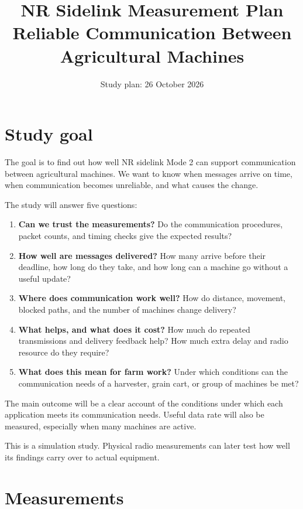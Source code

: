 \documentclass[11pt,a4paper]{article}
\title{\textbf{NR Sidelink Measurement Plan}\\[0.4em]
\large Reliable Communication Between Agricultural Machines}
\author{}
\date{Study plan: 26 October 2026}
\begin{document}
\maketitle

\section{Study goal}

The goal is to find out how well NR sidelink Mode 2 can support communication
between agricultural machines. We want to know when messages arrive on time,
when communication becomes unreliable, and what causes the change.

The study will answer five questions:
\begin{enumerate}
  \item \textbf{Can we trust the measurements?}
        Do the communication procedures, packet counts, and timing checks
        give the expected results?
  \item \textbf{How well are messages delivered?}
        How many arrive before their deadline, how long do they take,
        and how long can a machine go without a useful update?
  \item \textbf{Where does communication work well?}
        How do distance, movement, blocked paths, and the number of machines
        change delivery?
  \item \textbf{What helps, and what does it cost?}
        How much do repeated transmissions and delivery feedback help?
        How much extra delay and radio resource do they require?
  \item \textbf{What does this mean for farm work?}
        Under which conditions can the communication needs of a harvester,
        grain cart, or group of machines be met?
\end{enumerate}

The main outcome will be a clear account of the conditions under which each
application meets its communication needs. Useful data rate will also be
measured, especially when many machines are active.

This is a simulation study. Physical radio measurements can later test how
well its findings carry over to actual equipment.

\section{Measurements}
\label{sec:metrics}
\end{document}
